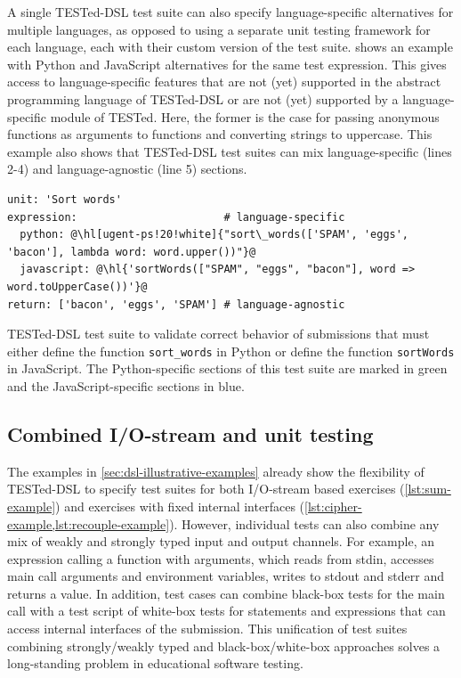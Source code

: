 \documentclass[../main]{subfiles}
\begin{document}
A single TESTed-DSL test suite can also specify language-specific alternatives for multiple languages, as opposed to using a separate unit testing framework for each language, each with their custom version of the test suite.
 shows an example with Python and JavaScript alternatives for the same test expression.
This gives access to language-specific features that are not (yet) supported in the abstract programming language of TESTed-DSL or are not (yet) supported by a language-specific module of TESTed.
Here, the former is the case for passing anonymous functions as arguments to functions and converting strings to uppercase.
This example also shows that TESTed-DSL test suites can mix language-specific (lines 2-4) and language-agnostic (line 5) sections.

\begin{listing}
    \begin{verbatim}
unit: 'Sort words'
expression:                       # language-specific
  python: @\hl[ugent-ps!20!white]{"sort\_words(['SPAM', 'eggs', 'bacon'], lambda word: word.upper())"}@
  javascript: @\hl{'sortWords(["SPAM", "eggs", "bacon"], word => word.toUpperCase())'}@
return: ['bacon', 'eggs', 'SPAM'] # language-agnostic
    \end{verbatim}
    \caption[]{
        TESTed-DSL test suite to validate correct behavior of submissions that must either define the function \texttt{sort\_words} in Python or define the function \texttt{sortWords} in JavaScript. The Python-specific sections of this test suite are marked in green and the JavaScript-specific sections in blue.
    }
    \label{lst:multiple-test-suite}
\end{listing}

\subsection{Combined I/O-stream and unit testing}\label{subsec:combined-i/o-stream-and-unit-testing}

The examples in \vref{sec:dsl-illustrative-examples} already show the flexibility of TESTed-DSL to specify test suites for both I/O-stream based exercises (\vref{lst:sum-example}) and exercises with fixed internal interfaces (\vref{lst:cipher-example,lst:recouple-example}).
However, individual tests can also combine any mix of weakly and strongly typed input and output channels.
For example, an expression calling a function with arguments, which reads from stdin, accesses main call arguments and environment variables, writes to stdout and stderr and returns a value.
In addition, test cases can combine black-box tests for the main call with a test script of white-box tests for statements and expressions that can access internal interfaces of the submission.
This unification of test suites combining strongly/weakly typed and black-box/white-box approaches solves a long-standing problem in educational software testing.
\end{document}
